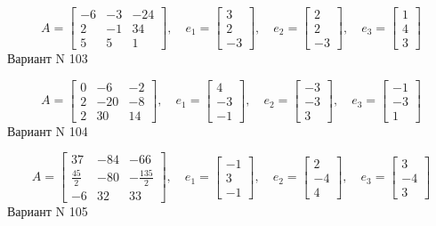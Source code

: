 \documentclass[11pt]{report}
\begin{document}
$$A = \left[\begin{matrix}-6 & -3 & -24\\2 & -1 & 34\\5 & 5 & 1\end{matrix}\right],\quad e_1 = \left[\begin{matrix}3\\2\\-3\end{matrix}\right],\quad e_2 = \left[\begin{matrix}2\\2\\-3\end{matrix}\right],\quad e_3 = \left[\begin{matrix}1\\4\\3\end{matrix}\right]$$Вариант N 103

$$A = \left[\begin{matrix}0 & -6 & -2\\2 & -20 & -8\\2 & 30 & 14\end{matrix}\right],\quad e_1 = \left[\begin{matrix}4\\-3\\-1\end{matrix}\right],\quad e_2 = \left[\begin{matrix}-3\\-3\\3\end{matrix}\right],\quad e_3 = \left[\begin{matrix}-1\\-3\\1\end{matrix}\right]$$Вариант N 104

$$A = \left[\begin{matrix}37 & -84 & -66\\\frac{45}{2} & -80 & - \frac{135}{2}\\-6 & 32 & 33\end{matrix}\right],\quad e_1 = \left[\begin{matrix}-1\\3\\-1\end{matrix}\right],\quad e_2 = \left[\begin{matrix}2\\-4\\4\end{matrix}\right],\quad e_3 = \left[\begin{matrix}3\\-4\\3\end{matrix}\right]$$Вариант N 105
\end{document}
